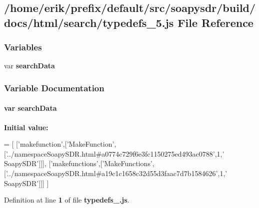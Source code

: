 \subsection{/home/erik/prefix/default/src/soapysdr/build/docs/html/search/typedefs\+\_\+5.js File Reference}
\label{typedefs__5_8js}
\subsubsection*{Variables}
\begin{DoxyCompactItemize}
\item 
var {\bf search\+Data}
\end{DoxyCompactItemize}


\subsubsection{Variable Documentation}
\paragraph[{search\+Data}]{\setlength{\rightskip}{0pt plus 5cm}var search\+Data}\label{typedefs__5_8js_ad01a7523f103d6242ef9b0451861231e}
{\bfseries Initial value\+:}
\begin{DoxyCode}
=
[
  [\textcolor{stringliteral}{'makefunction'},[\textcolor{stringliteral}{'MakeFunction'},[\textcolor{stringliteral}{'../namespaceSoapySDR.html#a0774c729f6e3fc1150275ed493ac0788'},1,\textcolor{stringliteral}{'
      SoapySDR'}]]],
  [\textcolor{stringliteral}{'makefunctions'},[\textcolor{stringliteral}{'MakeFunctions'},[\textcolor{stringliteral}{'../namespaceSoapySDR.html#a19c1c1658c32d55d3faac7d7b1584626'},1,\textcolor{stringliteral}{'
      SoapySDR'}]]]
]
\end{DoxyCode}


Definition at line {\bf 1} of file {\bf typedefs\+\_.\+js}.

